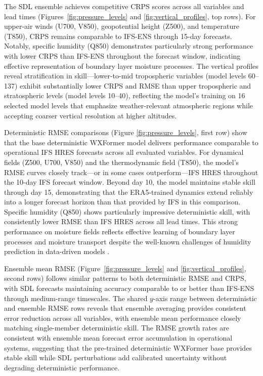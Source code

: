 \documentclass{agujournal2019}
\begin{document}
The SDL ensemble achieves competitive CRPS scores across all variables and lead times (Figures~\ref{fig:pressure_levels} and \ref{fig:vertical_profiles}, top rows). For upper-air winds (U700, V850), geopotential height (Z500), and temperature (T850), CRPS remains comparable to IFS-ENS through 15-day forecasts. Notably, specific humidity (Q850) demonstrates particularly strong performance with lower CRPS than IFS-ENS throughout the forecast window, indicating effective representation of boundary layer moisture processes. The vertical profiles reveal stratification in skill—lower-to-mid tropospheric variables (model levels 60--137) exhibit substantially lower CRPS and RMSE than upper tropospheric and stratospheric levels (model levels 10--40), reflecting the model's training on 16 selected model levels that emphasize weather-relevant atmospheric regions while accepting coarser vertical resolution at higher altitudes.

Deterministic RMSE comparisons (Figure \ref{fig:pressure_levels}, first row) show that the base deterministic WXFormer model delivers performance comparable to operational IFS HRES forecasts across all evaluated variables. For dynamical fields (Z500, U700, V850) and the thermodynamic field (T850), the model’s RMSE curves closely track—or in some cases outperform—IFS HRES throughout the 10-day IFS forecast window. Beyond day 10, the model maintains stable skill through day 15, demonstrating that the ERA5-trained dynamics extend reliably into a longer forecast horizon than that provided by IFS in this comparison. Specific humidity (Q850) shows particularly impressive deterministic skill, with consistently lower RMSE than IFS HRES across all lead times. This strong performance on moisture fields reflects effective learning of boundary layer processes and moisture transport despite the well-known challenges of humidity prediction in data-driven models \cite{bi2023pangu, Lam2023graphcast}.

Ensemble mean RMSE (Figure~\ref{fig:pressure_levels} and \ref{fig:vertical_profiles}, second rows) follows similar patterns to both deterministic RMSE and CRPS, with SDL forecasts maintaining accuracy comparable to or better than IFS-ENS through medium-range timescales. The shared $y$-axis range between deterministic and ensemble RMSE rows reveals that ensemble averaging provides consistent error reduction across all variables, with ensemble mean performance closely matching single-member deterministic skill. The RMSE growth rates are consistent with ensemble mean forecast error accumulation in operational systems, suggesting that the pre-trained deterministic WXFormer base provides stable skill while SDL perturbations add calibrated uncertainty without degrading deterministic performance.
\end{document}
